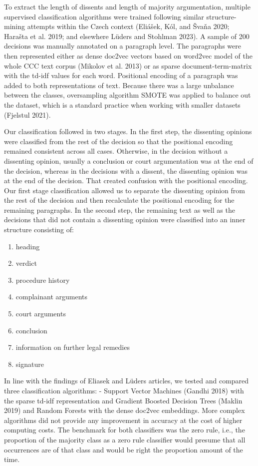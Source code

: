 \documentclass[
  11pt,
]{article}
\providecommand{\tightlist}{%
  \setlength{\itemsep}{0pt}\setlength{\parskip}{0pt}}
\begin{document}
To extract the length of dissents and length of majority argumentation,
multiple supervised classification algorithms were trained following
similar structure-mining attempts within the Czech context (Eliášek,
Kól, and Švaňa 2020; Harašta et al. 2019; and elsewhere Lüders and
Stohlman 2023). A sample of 200 decisions was manually annotated on a
paragraph level. The paragraphs were then represented either as dense
doc2vec vectors based on word2vec model of the whole CCC text corpus
(Mikolov et al. 2013) or as sparse document-term-matrix with the td-idf
values for each word. Positional encoding of a paragraph was added to
both representations of text. Because there was a large unbalance
between the classes, oversampling algorithm SMOTE was applied to balance
out the dataset, which is a standard practice when working with smaller
datasets (Fjelstul 2021).

Our classification followed in two stages. In the first step, the
dissenting opinions were classified from the rest of the decision so
that the positional encoding remained consistent across all cases.
Otherwise, in the decision without a dissenting opinion, usually a
conclusion or court argumentation was at the end of the decision,
whereas in the decisions with a dissent, the dissenting opinion was at
the end of the decision. That created confusion with the positional
encoding. Our first stage classification allowed us to separate the
dissenting opinion from the rest of the decision and then recalculate
the positional encoding for the remaining paragraphs. In the second
step, the remaining text as well as the decisions that did not contain a
dissenting opinion were classified into an inner structure consisting
of:

\begin{enumerate}
\def\labelenumi{(\arabic{enumi})}
\tightlist
\item
  heading
\item
  verdict
\item
  procedure history
\item
  complainant arguments
\item
  court arguments
\item
  conclusion
\item
  information on further legal remedies
\item
  signature
\end{enumerate}

In line with the findings of Eliasek and Lüders articles, we tested and
compared three classification algorithms: - Support Vector Machines
(Gandhi 2018) with the sparse td-idf representation and Gradient Boosted
Decision Trees (Maklin 2019) and Random Forests with the dense doc2vec
embeddings. More complex algorithms did not provide any improvement in
accuracy at the cost of higher computing costs. The benchmark for both
classifiers was the zero rule, i.e., the proportion of the majority
class as a zero rule classifier would presume that all occurrences are
of that class and would be right the proportion amount of the time.
\end{document}
